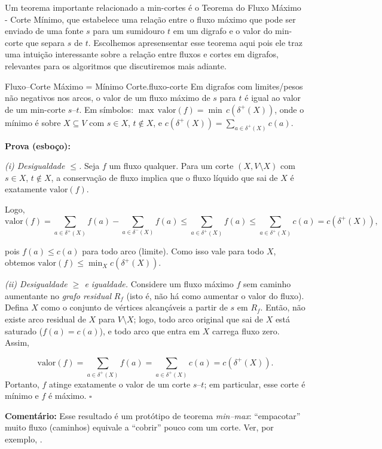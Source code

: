Um teorema importante relacionado a min-cortes é o Teorema do Fluxo Máximo - Corte Mínimo, que estabelece uma relação entre o fluxo máximo que pode ser enviado de uma fonte \(s\) para um sumidouro \(t\) em um digrafo e o valor do min-corte que separa \(s\) de \(t\). Escolhemos apresensentar esse teorema aqui pois ele traz uma intuição interessante sobre a relação entre fluxos e cortes em digrafos, relevantes para os algoritmos que discutiremos mais adiante.


\begin{teobox}{Fluxo–Corte Máximo = Mínimo Corte.}{fluxo-corte}
	Em digrafos com limites/pesos não negativos nos arcos, o valor de um fluxo máximo de \(s\) para \(t\) é igual ao valor de um min-corte \(s\text{--}t\). Em símbolos: \(\max\,\text{valor}(f) = \min\, c(\delta^+(X))\), onde o mínimo é sobre \(X\subseteq V\) com \(s\in X\), \(t\notin X\), e \(c(\delta^+(X))=\sum_{a\in\delta^+(X)} c(a)\).

	\textbf{Prova (esboço):}

	\emph{(i) Desigualdade \(\le\).} Seja \(f\) um fluxo qualquer. Para um corte \((X, V\setminus X)\) com \(s\in X\), \(t\notin X\), a conservação de fluxo implica que o fluxo líquido que sai de \(X\) é exatamente \(\text{valor}(f)\).

	Logo, \[\text{valor}(f)= \sum_{a\in\delta^+(X)} f(a) - \sum_{a\in\delta^-(X)} f(a) \le \sum_{a\in\delta^+(X)} f(a) \le \sum_{a\in\delta^+(X)} c(a)=c(\delta^+(X)),\]

	pois \(f(a)\le c(a)\) para todo arco (limite). Como isso vale para todo \(X\), obtemos \(\text{valor}(f)\le \min_X c(\delta^+(X))\).


	\emph{(ii) Desigualdade \(\ge\) e igualdade.} Considere um fluxo máximo \(f\) sem caminho aumentante no \emph{grafo residual} \(R_f\) (isto é, não há como aumentar o valor do fluxo). Defina \(X\) como o conjunto de vértices alcançáveis a partir de \(s\) em \(R_f\). Então, não existe arco residual de \(X\) para \(V\setminus X\); logo, todo arco original que sai de \(X\) está saturado (\(f(a)=c(a)\)), e todo arco que entra em \(X\) carrega fluxo zero. Assim,

	\[\text{valor}(f)=\sum_{a\in\delta^+(X)} f(a)=\sum_{a\in\delta^+(X)} c(a)=c(\delta^+(X)).\]
	Portanto, \(f\) atinge exatamente o valor de um corte \(s\text{--}t\); em particular, esse corte é mínimo e \(f\) é máximo. \hfill$\square$


	\smallskip
	\textbf{Comentário:} Esse resultado é um protótipo de teorema \emph{min--max}: “empacotar” muito fluxo (caminhos) equivale a “cobrir” pouco com um corte. Ver, por exemplo, \cite{schrijver2003comb}.
\end{teobox}


